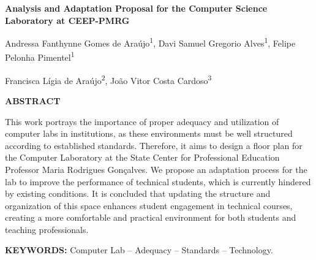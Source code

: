 \documentclass[12pt, openright, oneside, a4paper, brazil]{abntex2}
\begin{document}
\newpage
\begin{center}
  {\fontsize{14}{16}\selectfont\bfseries Analysis and Adaptation Proposal for the Computer Science Laboratory at CEEP-PMRG \par}
  \vspace{0.6cm}
  
  {\fontsize{12}{14}\selectfont
    Andressa Fanthynne Gomes de Araújo\textsuperscript{1}, 
    Davi Samuel Gregorio Alves\textsuperscript{1}, 
    Felipe Pelonha Pimentel\textsuperscript{1}\par
    \vspace{0.2cm}
    Francisca Lígia de Araújo\textsuperscript{2}, 
    João Vitor Costa Cardoso\textsuperscript{3}
  }
\end{center}

\vspace{0.8cm}

\begin{center}
  {\bfseries\large ABSTRACT}
\end{center}

\vspace{0.4cm}

\begin{SingleSpace}
  \noindent
  This work portrays the importance of proper adequacy and utilization of computer labs in institutions, as these environments must be well structured according to established standards. Therefore, it aims to design a floor plan for the Computer Laboratory at the State Center for Professional Education Professor Maria Rodrigues Gonçalves. We propose an adaptation process for the lab to improve the performance of technical students, which is currently hindered by existing conditions. It is concluded that updating the structure and organization of this space enhances student engagement in technical courses, creating a more comfortable and practical environment for both students and teaching professionals.
  
  \vspace{0.6cm}
  \noindent\textbf{KEYWORDS:} Computer Lab -- Adequacy -- Standards -- Technology.
\end{SingleSpace}
\end{document}
